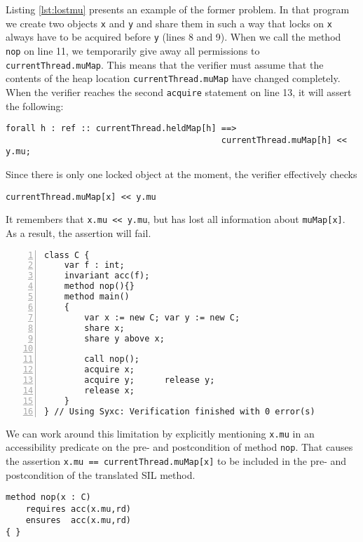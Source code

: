 Listing \ref{lst:lostmu} presents an example of the former problem. 
In that program we create two objects \lstinline!x! and \lstinline!y! and share them in such a way that locks on \lstinline!x! always have to be acquired before \lstinline!y! (lines 8 and 9).
When we call the method \lstinline!nop! on line 11, we temporarily give away all permissions to \lstinline!currentThread.muMap!.
This means that the verifier must assume that the contents of the heap location \lstinline!currentThread.muMap! have changed completely.
When the verifier reaches the second \lstinline[language=Chalice]!acquire! statement on line 13, it will assert the following:
\begin{lstlisting}[language=SIL]
forall h : ref :: currentThread.heldMap[h] ==> 
                                           currentThread.muMap[h] << y.mu;
\end{lstlisting}
Since there is only one locked object at the moment, the verifier effectively checks 
\begin{lstlisting}
currentThread.muMap[x] << y.mu
\end{lstlisting}
It remembers that \lstinline!x.mu << y.mu!, but has lost all information about \lstinline!muMap[x]!.
As a result, the assertion will fail.

\begin{lstlisting}[float,caption={Losing information about \lstinline!mu!.},label=lst:lostmu,language=chalice,numbers=left]
class C {
    var f : int;
    invariant acc(f);
    method nop(){}
    method main()
    {
        var x := new C; var y := new C;
        share x;        
        share y above x;

        call nop();
        acquire x;
        acquire y;      release y;
        release x;
    }
} // Using Syxc: Verification finished with 0 error(s)
\end{lstlisting}

We can work around this limitation by explicitly mentioning \lstinline!x.mu! in an accessibility predicate on the pre- and postcondition of method \lstinline!nop!.
That causes the assertion 
\lstinline[language=SIL]!x.mu == currentThread.muMap[x]!
to be included in the pre- and postcondition of the translated SIL method.

\begin{lstlisting}[float,caption={Modified method \lstinline!nop! from listing \ref{lst:lostmu}, causes verification to succeed.},label=lst:lostmufixed,language=chalice]
method nop(x : C)
    requires acc(x.mu,rd)
    ensures  acc(x.mu,rd)
{ }
\end{lstlisting}

